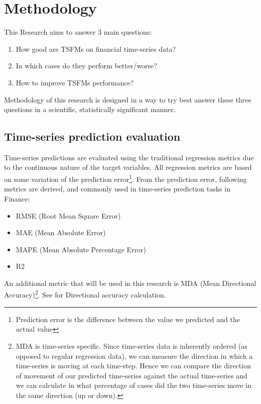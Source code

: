 \section{Methodology} 

This Research aims to answer 3 main questions:

\begin{enumerate}
  \item How good are TSFMs on financial time-series data?
  \item In which cases do they perform better/worse?
  \item How to improve TSFMs performance?
\end{enumerate}

Methodology of this research is designed in a way to try best answer these three questions in a scientific, statistically significant manner.

\subsection{Time-series prediction evaluation}

Time-series predictions are evaluated using the traditional regression metrics due to the continuous nature of the target variables. All regression metrics are based on some variation of the prediction error\footnote{Prediction error is the difference between the value we predicted and the actual value}. From the prediction error, following metrics are derived, and commonly used in time-series prediction tasks in Finance\cite{hu2021survey}:

\begin{itemize}
  \item RMSE (Root Mean Square Error)
  \item MAE (Mean Absolute Error)
  \item MAPE (Mean Absolute Percentage Error)
  \item R2
\end{itemize}

An additional metric that will be used in this research is MDA (Mean Directional Accuracy)\footnote{MDA is time-series specific. Since time-series data is inherently ordered (as opposed to regular regression data), we can measure the direction in which a time-series is moving at each time-step. Hence we can compare the direction of movement of our predicted time-series against the actual time-series and we can calculate in what percentage of cases did the two time-series move in the same direction (up or down).}. See \cite{costantini2016forecasting} for Directional accuracy calculation.

